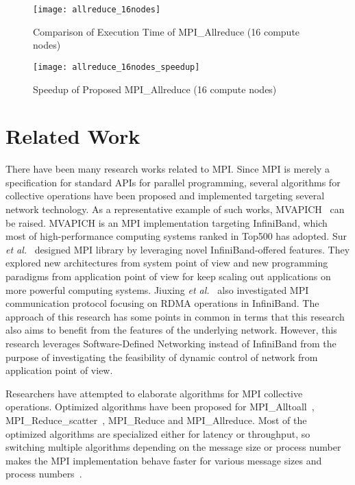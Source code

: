 \begin{figure}
    \centering
    \texttt{[image: allreduce\_16nodes]}
    \caption{Comparison of Execution Time of MPI\_Allreduce (16 compute nodes)}%
    \label{fig:evaluation-16nodes}
\end{figure}

\begin{figure}
    \centering
    \texttt{[image: allreduce\_16nodes\_speedup]}
    \caption{Speedup of Proposed MPI\_Allreduce (16 compute nodes)}%
    \label{fig:evaluation-16nodes-normalized}
\end{figure}

\section{Related Work}\label{sec:iii-related-work}

There have been many research works related to MPI\@. Since MPI is merely a
specification for standard APIs for parallel programming, several algorithms
for collective operations have been proposed and implemented targeting several
network technology. As a representative example of such works,
MVAPICH~\autocite{mvapich} can be raised. MVAPICH is an MPI implementation
targeting InfiniBand, which most of high-performance computing systems ranked
in Top500 has adopted. Sur \emph{et al.}~\autocite{Sur2011} designed MPI
library by leveraging novel InfiniBand-offered features.
They explored new architectures from system point of view and new programming
paradigms from application point of view for keep scaling out applications on
more powerful computing systems. Jiuxing \emph{et al.}~\autocite{Jiuxing2004}
also investigated MPI communication protocol focusing on RDMA operations in
InfiniBand. The approach of this research has some points in common in terms
that this research also aims to benefit from the features of the underlying
network. However, this research leverages Software-Defined Networking instead
of InfiniBand from the purpose of investigating the feasibility of dynamic
control of network from application point of view.

Researchers have attempted to elaborate algorithms for MPI collective
operations. Optimized algorithms have been proposed for
MPI\_Alltoall~\autocite{Bruck1997},
MPI\_Reduce\_scatter~\autocite{Iannello1997}, MPI\_Reduce and MPI\_Allreduce.
Most of the optimized algorithms are specialized either for latency or
throughput, so switching multiple algorithms depending on the message size or
process number makes the MPI implementation behave faster for various message
sizes and process numbers~\autocite{Thakur2005}.

